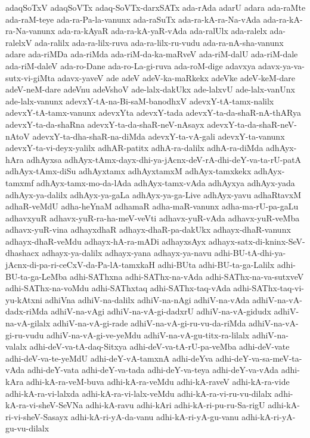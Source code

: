 {adaqSoTxV
adaqSoVTx
adaq-SoVTx-darxSATx
ada-rAda
adarU
adara
ada-raMte
ada-raM-teye
ada-ra-Pa-la-vanunx
ada-raSuTx
ada-ra-kA-ra-Na-vAda
ada-ra-kA-ra-Na-vanunx
ada-ra-kAyaR
ada-ra-kA-yaR-vAda
ada-ralUlx
ada-ralelx
ada-ralelxV
ada-ralilx
ada-ra-lilx-ruva
ada-ra-lilx-ru-vudu
ada-ra-nA-sha-vanunx
adare
ada-riMDa
ada-riMda
ada-riM-da-ka-maRveV
ada-riM-dalU
ada-riM-dale
ada-riM-daleV
ada-ro-Dane
ada-ro-La-gi-ruva
ada-roM-dige
adavxya
adavx-ya-va-sutx-vi-giMta
adavx-yaveV
ade
adeV
adeV-ka-maRkekx
adeVke
adeV-keM-dare
adeV-neM-dare
adeVnu
adeVshoV
ade-lalx-dakUkx
ade-lalxvU
ade-lalx-vanUnx
ade-lalx-vanunx
adevxY-tA-na-Bi-saM-banodhxV
adevxY-tA-tamx-nalilx
adevxY-tA-tamx-vanunx
adevxYta
adevxY-tada
adevxY-ta-da-shaR-nA-thARya
adevxY-ta-da-shaRna
adevxY-ta-da-shaR-neV-nAsayx
adevxY-ta-da-shaR-neV-nAtoV
adevxY-ta-dha-shaR-na-diMda
adevxY-ta-vA-gali
adevxY-ta-vanunx
adevxY-ta-vi-deyx-yalilx
adhAR-patitx
adhA-ra-dalilx
adhA-ra-diMda
adhAyx-hAra
adhAyxsa
adhAyx-tAmx-dayx-dhi-ya-jAcnx-deV-rA-dhi-deY-va-ta-rU-patA
adhAyx-tAmx-diSu
adhAyxtamx
adhAyxtamxM
adhAyx-tamxkekx
adhAyx-tamxmf
adhAyx-tamx-mo-da-lAda
adhAyx-tamx-vAda
adhAyxya
adhAyx-yada
adhAyx-ya-dalilx
adhAyx-ya-gaLa
adhAyx-ya-ga-Live
adhAyx-yavu
adhaRtavxM
adhaR-veMdU
adha-heYnaM
adhamaR
adha-maR-vanunx
adha-ma-rU-pa-gaLu
adhavxyuR
adhavx-yuR-ra-ha-meV-veVti
adhavx-yuR-vAda
adhavx-yuR-veMba
adhavx-yuR-vina
adhayxdhaR
adhayx-dhaR-pa-dakUkx
adhayx-dhaR-vanunx
adhayx-dhaR-veMdu
adhayx-hA-ra-mADi
adhayxsAyx
adhayx-satx-di-kninx-SeV-dhashacx
adhayx-ya-dalilx
adhayx-yana
adhayx-ya-navu
adhi-BU-tA-dhi-ya-jAcnx-di-pa-ri-ceCxV-da-Pa-lA-tamxkaH
adhi-BUta
adhi-BU-ta-ga-Lalilx
adhi-BU-ta-ga-LeMba
adhi-SAThxna
adhi-SAThx-na-vAda
adhi-SAThx-na-va-sutxveV
adhi-SAThx-na-voMdu
adhi-SAThxtaq
adhi-SAThx-taq-vAda
adhi-SAThx-taq-vi-yu-kAtxni
adhiVna
adhiV-na-dalilx
adhiV-na-nAgi
adhiV-na-vAda
adhiV-na-vA-dadx-riMda
adhiV-na-vAgi
adhiV-na-vA-gi-dadxrU
adhiV-na-vA-gidudx
adhiV-na-vA-gilalx
adhiV-na-vA-gi-rade
adhiV-na-vA-gi-ru-vu-da-riMda
adhiV-na-vA-gi-ru-vudu
adhiV-na-vA-gi-ve-yeMdu
adhiV-na-vA-gu-titx-ra-lilalx
adhiV-na-valalx
adhi-deV-va-tA-daq-Sitxya
adhi-deV-va-tA-rU-pa-veMba
adhi-deV-vate
adhi-deV-va-te-yeMdU
adhi-deY-vA-tamxnA
adhi-deYva
adhi-deY-va-sa-meV-ta-vAda
adhi-deY-vata
adhi-deY-va-tada
adhi-deY-va-teya
adhi-deY-va-vAda
adhi-kAra
adhi-kA-ra-veM-buva
adhi-kA-ra-veMdu
adhi-kA-raveV
adhi-kA-ra-vide
adhi-kA-ra-vi-lalxda
adhi-kA-ra-vi-lalx-veMdu
adhi-kA-ra-vi-ru-vu-dilalx
adhi-kA-ra-vi-sheV-SeVNa
adhi-kA-ravu
adhi-kAri
adhi-kA-ri-pu-ru-Sa-rigU
adhi-kA-ri-vi-sheV-Sasayx
adhi-kA-ri-yA-da-vanu
adhi-kA-ri-yA-gu-vanu
adhi-kA-ri-yA-gu-vu-dilalx
}
